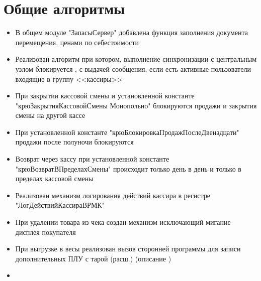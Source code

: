 \section{Общие алгоритмы}




\begin{itemize}
	\item В общем модуле "ЗапасыСервер" добавлена функция заполнения документа перемещения, ценами по себестоимости 
	\item Реализован алгоритм при котором, выполнение синхронизации с центральным узлом блокируется , с выдачей сообщения, если есть активные пользователи входящие в группу <<кассиры>>
	\item При закрытии кассовой смены и установленной константе "крюЗакрытияКассовойСмены Монопольно" блокируются продажи и закрытия смены на другой кассе	
	\item При установленной константе "крюБлокировкаПродажПослеДвенадцати" продажи после полуночи блокируются
	\item Возврат через кассу при установленной константе "крюВозвратВПределахСмены" происходит только день в день и только в пределах кассовой смены
	\item Реализован механизм логирования действий кассира в регистре "ЛогДействийКассираВРМК"
	\item При удалении товара из чека создан механизм исключающий мигание дисплея покупателя
	\item При выгрузке в весы реализован вызов сторонней программы для записи дополнительных ПЛУ с тарой
		(расш.)
	 (описание )
	\item 
\end{itemize}

